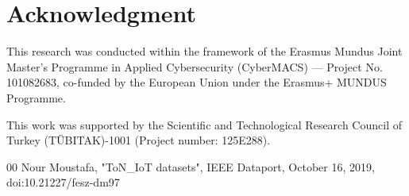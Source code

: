 \documentclass[conference]{IEEEtran}
\begin{document}
\section*{Acknowledgment}

This research was conducted within the framework of the Erasmus Mundus Joint Master’s Programme in Applied Cybersecurity (CyberMACS) — Project No. 101082683, co-funded by the European Union under the Erasmus+ MUNDUS Programme.

This work was supported by the Scientific and Technological Research Council of Turkey (TÜBITAK)-1001 (Project number: 125E288).

\begin{thebibliography}{00}
 Nour Moustafa, "ToN\_IoT datasets", IEEE Dataport, October 16, 2019, doi:10.21227/fesz-dm97
\end{thebibliography}
\end{document}
